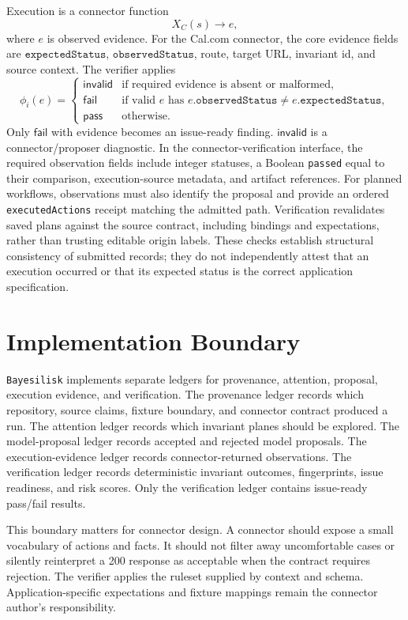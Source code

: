 \documentclass[10pt]{article}
\newcommand{\tool}{\texttt{Bayesilisk}\xspace}
\newcommand{\Pass}{\mathsf{pass}}
\newcommand{\Fail}{\mathsf{fail}}
\newcommand{\Invalid}{\mathsf{invalid}}
\begin{document}
Execution is a connector function
\[
  X_C(s) \rightarrow e,
\]
where \(e\) is observed evidence. For the Cal.com connector, the core evidence
fields are \(\texttt{expectedStatus}\), \(\texttt{observedStatus}\), route,
target URL, invariant id, and source context. The verifier applies
\[
  \phi_i(e) =
  \begin{cases}
    \Invalid & \text{if required evidence is absent or malformed},\\
    \Fail & \text{if valid } e \text{ has }
      e.\texttt{observedStatus} \ne e.\texttt{expectedStatus},\\
    \Pass & \text{otherwise.}
  \end{cases}
\]
Only \(\Fail\) with evidence becomes an issue-ready finding. \(\Invalid\) is a
connector/proposer diagnostic. In the connector-verification interface, the
required observation fields include integer statuses, a Boolean
\texttt{passed} equal to their comparison, execution-source metadata, and
artifact references. For planned workflows, observations must also identify the proposal and
provide an ordered \texttt{executedActions} receipt matching the admitted path.
Verification revalidates saved plans against the source contract, including
bindings and expectations, rather than trusting editable origin labels.
These checks establish structural consistency of submitted records; they do
not independently attest that an execution occurred or that its expected status
is the correct application specification.

\section{Implementation Boundary}

\tool implements separate ledgers for provenance, attention, proposal, execution
evidence, and verification. The provenance ledger records which repository,
source claims, fixture boundary, and connector contract produced a run. The
attention ledger records which invariant planes should be explored. The
model-proposal ledger records accepted and rejected model proposals. The
execution-evidence ledger records connector-returned observations. The
verification ledger records deterministic invariant outcomes, fingerprints,
issue readiness, and risk scores. Only the verification ledger contains
issue-ready pass/fail results.

This boundary matters for connector design. A connector should expose a small
vocabulary of actions and facts. It should not filter away uncomfortable cases
or silently reinterpret a 200 response as acceptable when the contract requires
rejection. The verifier applies the ruleset supplied by context and schema.
Application-specific expectations and fixture mappings remain the connector
author's responsibility.
\end{document}

